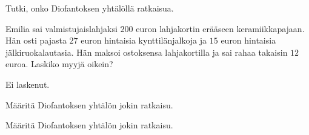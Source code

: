 

\begin{kotitehtavasivu}

\begin{tehtava}
    Tutki, onko Diofantoksen yhtälöllä ratkaisua.
    

    \begin{vastaus}
    \end{vastaus}
    
\end{tehtava}

\begin{tehtava}
    Emilia sai valmistujaislahjaksi $200$ euron lahjakortin erääseen keramiikkapajaan. Hän osti pajasta $27$ euron hintaisia kynttilänjalkoja ja $15$ euron hintaisia jälkiruokalautasia. Hän maksoi ostoksensa lahjakortilla ja sai rahaa takaisin $12$ euroa. Laskiko myyjä oikein?
    
    \begin{vastaus}
        Ei laskenut.
    \end{vastaus}
    
\end{tehtava}

\begin{tehtava}
    Määritä Diofantoksen yhtälön jokin ratkaisu.

    
    \begin{vastaus}
    \end{vastaus}
    
\end{tehtava}

\begin{tehtava}
    Määritä Diofantoksen yhtälön jokin ratkaisu.

    
    \begin{vastaus}
    \end{vastaus}
    

\end{tehtava}
\end{kotitehtavasivu}

